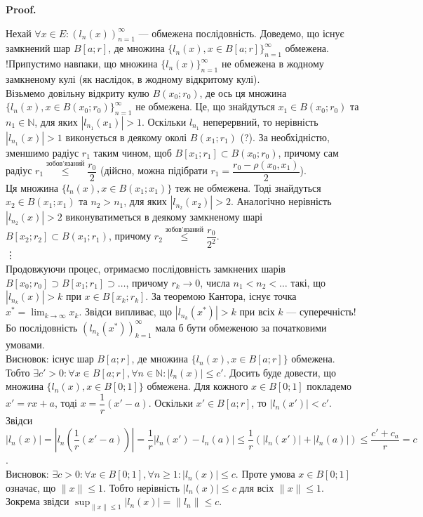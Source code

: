 \documentclass[a4paper, 10pt]{article}
\makeatletter
\theoremstyle{theoremdd}
\theoremstyle{theoremdd}
\theoremstyle{theoremdd}
\theoremstyle{theoremdd}
\theoremstyle{theoremdd}
\theoremstyle{theoremdd}
\theoremstyle{theoremdd}
\theoremstyle{theoremdd}
\renewenvironment{proof}[1][Proof.\\]{\par
\pushQED{\hfill \qed}%
\normalfont \topsep6\p@\@plus6\p@\relax
\trivlist
\item\relax
{\bfseries
#1\@addpunct{.}}\hspace\labelsep\ignorespaces
}{%
\popQED\endtrivlist\@endpefalse
}
\makeatother
\begin{document}
\begin{proof}
Нехай $\forall x \in E: (l_n(x))_{n=1}^\infty$ --- обмежена послідовність. Доведемо, що існує замкнений шар $B[a;r]$, де множина $\{l_n(x), x \in B[a;r]\}_{n=1}^\infty$ обмежена.\\ 
!Припустимо навпаки, що множина $\{l_n(x)\}_{n=1}^\infty$ не обмежена в жодному замкненому кулі (як наслідок, в жодному відкритому кулі). \\
Візьмемо довільну відкриту кулю $B(x_0;r_0)$, де ось ця множина $\{l_n(x), x \in B(x_0;r_0)\}_{n=1}^\infty$ не обмежена. Це, що знайдуться $x_1 \in B(x_0;r_0)$ та $n_1 \in \mathbb{N}$, для яких $|l_{n_1}(x_1)| > 1$. Оскільки $l_{n_1}$ неперервний, то нерівність $|l_{n_1}(x)| > 1$ виконується в деякому околі $B(x_1;r_1)$ (?). За необхідністю, зменшимо радіус $r_1$ таким чином, щоб $B[x_1;r_1] \subset B(x_0;r_0)$, причому сам радіус $r_1 \overset{\text{зобов'язаний}}{\leq} \dfrac{r_0}{2}$ (дійсно, можна підібрати $r_1 = \dfrac{r_0 - \rho(x_0,x_1)}{2}$). \\
Ця множина $\{l_n(x), x \in B(x_1;x_1)\}$ теж не обмежена. Тоді знайдуться $x_2 \in B(x_1;x_1)$ та $n_2 > n_1$, для яких $|l_{n_2}(x_2)| > 2$. Аналогічно нерівність $|l_{n_2}(x)| > 2$ виконуватиметься в деякому замкненому шарі $B[x_2;r_2] \subset B(x_1;r_1)$, причому $r_2 \overset{\text{зобов'язаний}}{\leq} \dfrac{r_0}{2^2}$.\\
\vdots \\
Продовжуючи процес, отримаємо послідовність замкнених шарів $B[x_0;r_0] \supset B[x_1;r_1] \supset \dots$, причому $r_k \to 0$, числа $n_1 < n_2 < \dots$ такі, що $|l_{n_k}(x)| > k$ при $x \in B[x_k;r_k]$. За теоремою Кантора, існує точка $x^* = \displaystyle\lim_{k \to \infty} x_k$. Звідси випливає, що $|l_{n_k}(x^*)| > k$ при всіх $k$ --- суперечність! Бо послідовність $(l_{n_k}(x^*))_{k=1}^\infty$ мала б бути обмеженою за початковими умовами.\\
Висновок: існує шар $B[a;r]$, де множина $\{l_n(x), x \in B[a;r]\}$ обмежена. Тобто $\exists c' > 0: \forall x \in B[a;r], \forall n \in \mathbb{N}: |l_n(x)| \leq c'$. Досить буде довести, що множина $\{l_n(x), x \in B[0;1]\}$ обмежена. Для кожного $x \in B[0;1]$ покладемо $x' = rx + a$, тоді $x = \dfrac{1}{r}(x'-a)$. Оскільки $x' \in B[a;r]$, то $|l_n(x')| < c'$. Звідси\\
$|l_n(x)| = \left| l_n \left( \dfrac{1}{r}(x'-a) \right) \right| = \dfrac{1}{r} |l_n(x') - l_n(a)| \leq \dfrac{1}{r} (|l_n(x')| + |l_n(a)|) \leq \dfrac{c'+c_a}{r} = c$.\\
Висновок: $\exists c > 0: \forall x \in B[0;1], \forall n \geq 1: |l_n(x)| \leq c$. Проте умова $x \in B[0;1]$ означає, що $\|x\| \leq 1$. Тобто нерівність $|l_n(x)| \leq c$ для всіх $\|x\| \leq 1$. Зокрема звідси $\displaystyle\sup_{\|x\| \leq 1} |l_n(x)| = \|l_n\| \leq c$.
\end{proof}
\end{document}
